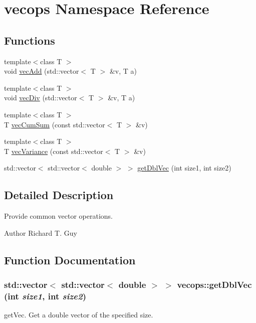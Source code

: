 \hypertarget{namespacevecops}{
\section{vecops Namespace Reference}
\label{namespacevecops}
}
\subsection*{Functions}
\begin{DoxyCompactItemize}
\item 
{\footnotesize template$<$class T $>$ }\\void \hyperlink{namespacevecops_a7b580307abbce16deb2805fe8ba71373}{vecAdd} (std::vector$<$ T $>$ \&v, T a)
\item 
{\footnotesize template$<$class T $>$ }\\void \hyperlink{namespacevecops_acec04644239d63fa4a301827c628ce0d}{vecDiv} (std::vector$<$ T $>$ \&v, T a)
\item 
{\footnotesize template$<$class T $>$ }\\T \hyperlink{namespacevecops_a8cdfcdb8afb9e355fab4565c9a6293c1}{vecCumSum} (const std::vector$<$ T $>$ \&v)
\item 
{\footnotesize template$<$class T $>$ }\\T \hyperlink{namespacevecops_ae2720237efabb24d26fe4e96a96f13f7}{vecVariance} (const std::vector$<$ T $>$ \&v)
\item 
std::vector$<$ std::vector$<$ double $>$ $>$ \hyperlink{namespacevecops_abfba65305a1e0f1d0ef498b39c752f15}{getDblVec} (int size1, int size2)
\end{DoxyCompactItemize}


\subsection{Detailed Description}
Provide common vector operations.

\begin{DoxyAuthor}{Author}
Richard T. Guy 
\end{DoxyAuthor}


\subsection{Function Documentation}
\hypertarget{namespacevecops_abfba65305a1e0f1d0ef498b39c752f15}{
\subsubsection[{getDblVec}]{\setlength{\rightskip}{0pt plus 5cm}std::vector$<$ std::vector$<$ double $>$ $>$ vecops::getDblVec (int {\em size1}, \/  int {\em size2})}}
\label{namespacevecops_abfba65305a1e0f1d0ef498b39c752f15}
getVec. Get a double vector of the specified size.


